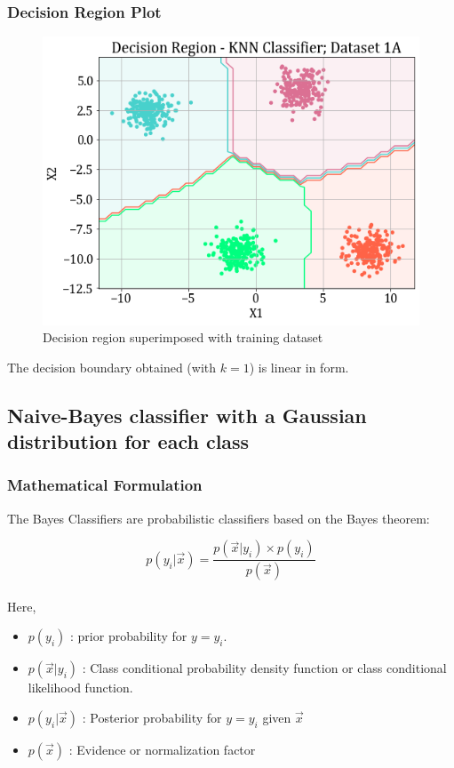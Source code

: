 \documentclass[11pt,a4paper]{article}
\newcommand{\noi}{\noindent}
\begin{document}
\subsubsection{Decision Region Plot}
\begin{figure}[H]
    \centering
    \includegraphics[scale=0.7]{images/1A/1A_knn_decision_region.png}
    \caption{Decision region superimposed with training dataset}
    \label{fig:1A_decreg_KNN}
\end{figure}

The decision boundary obtained (with $k=1$) is linear in form. 

\break
\subsection{Naive-Bayes classifier with a Gaussian distribution for each class}
\label{naive-bayes}
\subsubsection{Mathematical Formulation}
The Bayes Classifiers are probabilistic classifiers based on the Bayes theorem:

\begin{equation}
\label{eqn nb}
    p(y_{i}|\vec{x})=\frac{p(\vec{x}|y_{i}) \times p(y_{i})}{p(\vec{x})}
\end{equation}\\

\noi
Here,
\begin{itemize}
    \itemsep0em
    \item $p(y_{i})$ : prior probability for $y=y_{i}$.
    \item $p(\vec{x}|y_{i})$ : Class conditional probability density function or class conditional likelihood function.
    \item $p(y_{i}|\vec{x})$ : Posterior probability for $y=y_{i}$ given $\vec{x}$
    \item $p(\vec{x})$ : Evidence or normalization factor
\end{itemize}
\end{document}
